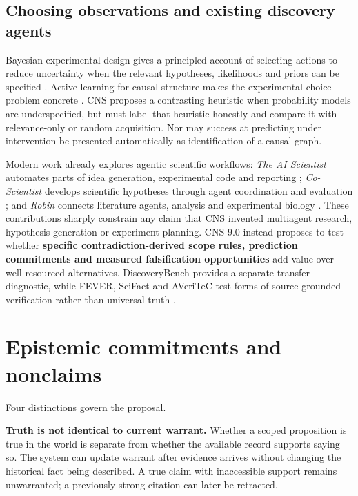 \documentclass[11pt,a4paper]{article}
\begin{document}
\subsection{Choosing observations and existing discovery
agents}\label{choosing-observations-and-existing-discovery-agents}

Bayesian experimental design gives a principled account of selecting
actions to reduce uncertainty when the relevant hypotheses, likelihoods
and priors can be specified \citep{R20}. Active learning for causal
structure makes the experimental-choice problem concrete \citep{R31}.
CNS proposes a contrasting heuristic when probability models are
underspecified, but must label that heuristic honestly and compare it
with relevance-only or random acquisition. Nor may success at predicting
under intervention be presented automatically as identification of a
causal graph.

Modern work already explores agentic scientific workflows: \emph{The AI
Scientist} automates parts of idea generation, experimental code and
reporting \citep{R34}; \emph{Co-Scientist} develops scientific
hypotheses through agent coordination and evaluation \citep{R35}; and
\emph{Robin} connects literature agents, analysis and experimental
biology \citep{R36}. These contributions sharply constrain any claim
that CNS invented multiagent research, hypothesis generation or
experiment planning. CNS 9.0 instead proposes to test whether
\textbf{specific contradiction-derived scope rules, prediction
commitments and measured falsification opportunities} add value over
well-resourced alternatives. DiscoveryBench provides a separate transfer
diagnostic, while FEVER, SciFact and AVeriTeC test forms of
source-grounded verification rather than universal truth
\citep{R25, R26, R27, R28}.

\section{Epistemic commitments and
nonclaims}\label{epistemic-commitments-and-nonclaims}

Four distinctions govern the proposal.

\textbf{Truth is not identical to current warrant.} Whether a scoped
proposition is true in the world is separate from whether the available
record supports saying so. The system can update warrant after evidence
arrives without changing the historical fact being described. A true
claim with inaccessible support remains unwarranted; a previously strong
citation can later be retracted.
\end{document}
